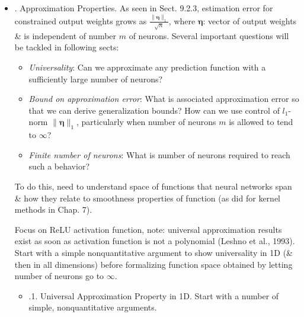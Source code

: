 \documentclass{article}
\newtheorem{problem}{Problem}
\begin{document}
\begin{enumerate}
\begin{itemize}
\begin{itemize}
\begin{itemize}
				\begin{problem}
					Consider a $1$-Lipschitz-continuous activation function $\sigma$ s.t. $\sigma(0) = 0$, \& classes of functions defined recursively as ${\cal F}_0 = \{{\bf x}\mapsto\boldsymbol{\theta}^\top{\bf x},\ \|\boldsymbol{\theta}\|_2\le D_0\}$, \&, for $i = 1,\ldots,M,{\cal F}_i = \{{\bf x}\mapsto\sum_{j=1}^{m_i} \theta_j\sigma(f_j({\bf x})),f_j\in{\cal F}_{i-1},\|\theta\|_1\le D_i\}$, corresponding to a neural network with $M$ layers. Assuming $\|{\bf x}\|_2\le R$ almost surely, show by recursion: Rademacher complexity satisfies $R_n({\cal F}_M)\le2^M\frac{R}{\sqrt{n}}\prod_{i=0}^M D_i$.
				\end{problem}
			\end{itemize}
			\item {. Approximation Properties.} As seen in Sect. 9.2.3, estimation error for constrained output weights grows as $\frac{\|\boldsymbol{\eta}\|_1}{\sqrt{n}}$, where $\boldsymbol{\eta}$: vector of output weights \& is independent of number $m$ of neurons. Several important questions will be tackled in following sects:
			\begin{itemize}
				\item {\it Universality}: Can we approximate any prediction function with a sufficiently large number of neurons?
				\item {\it Bound on approximation error}: What is associated approximation error so that we can derive generalization bounds? How can we use control of $l_1$-norm $\|\boldsymbol{\eta}\|_1$, particularly when number of neurons $m$ is allowed to tend to $\infty$?
				\item {\it Finite number of neurons}: What is number of neurons required to reach such a behavior?
			\end{itemize}
			To do this, need to understand space of functions that neural networks span \& how they relate to smoothness properties of function (as did for kernel methods in Chap. 7).
			
			Focus on ReLU activation function, note: universal approximation results exist as soon as activation function is not a polynomial (Leshno et al., 1993). Start with a simple nonquantitative argument to show universality in 1D (\& then in all dimensions) before formalizing function space obtained by letting number of neurons go to $\infty$.			
			\begin{itemize}
				\item {.1. Universal Approximation Property in 1D.} Start with a number of simple, nonquantitative arguments.
				

\end{itemize}
\end{itemize}
\end{itemize}
\end{enumerate}
\end{document}
